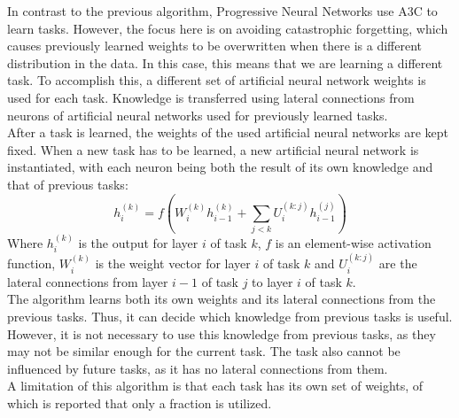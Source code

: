 In contrast to the previous algorithm, Progressive Neural Networks \parencite{Rusu2016} use A3C to learn tasks.
However, the focus here is on avoiding catastrophic forgetting, which causes previously learned weights to be overwritten when there is a different distribution in the data.
In this case, this means that we are learning a different task.
To accomplish this, a different set of artificial neural network weights is used for each task.
Knowledge is transferred using lateral connections from neurons of artificial neural networks used for previously learned tasks.\\
After a task is learned, the weights of the used artificial neural networks are kept fixed.
When a new task has to be learned, a new artificial neural network is instantiated, with each neuron being both the result of its own knowledge and that of previous tasks:
\begin{equation}
    h^{(k)}_i = f \left ( W^{(k)}_i h^{(k)}_{i-1} + \sum_{j<k} U^{(k:j)}_i h^{(j)}_{i-1} \right )
\end{equation}
Where $h^{(k)}_i$ is the output for layer $i$ of task $k$, $f$ is an element-wise activation function, $W^{(k)}_i$ is the weight vector for layer $i$ of task $k$ and $U^{(k:j)}_i$ are the lateral connections from layer $i-1$ of task $j$ to layer $i$ of task $k$.\\
The algorithm learns both its own weights and its lateral connections from the previous tasks.
Thus, it can decide which knowledge from previous tasks is useful.
However, it is not necessary to use this knowledge from previous tasks, as they may not be similar enough for the current task.
The task also cannot be influenced by future tasks, as it has no lateral connections from them.\\
A limitation of this algorithm is that each task has its own set of weights, of which is reported that only a fraction is utilized.
